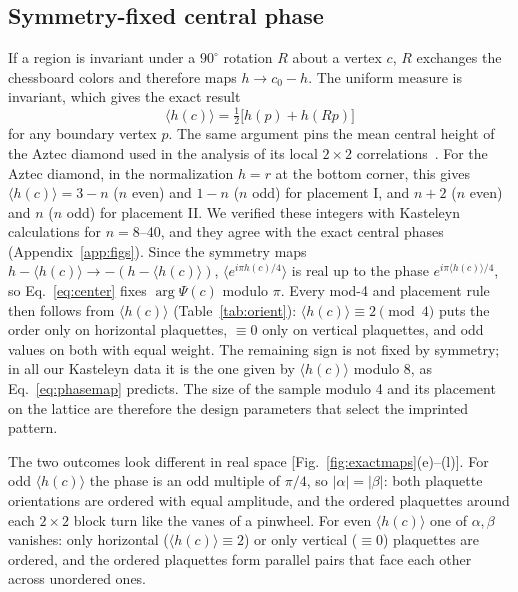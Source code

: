 \documentclass[aps,prb,twocolumn,floatfix,longbibliography]{revtex4-2}
\begin{document}
\subsection{Symmetry-fixed central phase}
\label{sec:center}

If a region is invariant under a $90^\circ$ rotation $R$ about a vertex $c$, $R$ exchanges the chessboard colors and therefore maps $h\to c_0-h$. The uniform measure is invariant, which gives the exact result
\begin{equation}
\langle h(c)\rangle=\tfrac12\bigl[h(p)+h(Rp)\bigr]
\label{eq:center}
\end{equation}
for any boundary vertex $p$. The same argument pins the mean central height of the Aztec diamond used in the analysis of its local $2\times2$ correlations~\cite{Kim2026}. For the Aztec diamond, in the normalization $h=r$ at the bottom corner, this gives $\langle h(c)\rangle=3-n$ ($n$ even) and $1-n$ ($n$ odd) for placement I, and $n+2$ ($n$ even) and $n$ ($n$ odd) for placement II. We verified these integers with Kasteleyn calculations for $n=8$--40, and they agree with the exact central phases (Appendix~\ref{app:figs}). Since the symmetry maps $h-\langle h(c)\rangle\to-(h-\langle h(c)\rangle)$, $\langle e^{i\pi h(c)/4}\rangle$ is real up to the phase $e^{i\pi\langle h(c)\rangle/4}$, so Eq.~\eqref{eq:center} fixes $\arg\Psi(c)$ modulo $\pi$. Every mod-4 and placement rule then follows from $\langle h(c)\rangle$ (Table~\ref{tab:orient}): $\langle h(c)\rangle\equiv2\pmod4$ puts the order only on horizontal plaquettes, $\equiv0$ only on vertical plaquettes, and odd values on both with equal weight. The remaining sign is not fixed by symmetry; in all our Kasteleyn data it is the one given by $\langle h(c)\rangle$ modulo 8, as Eq.~\eqref{eq:phasemap} predicts. The size of the sample modulo 4 and its placement on the lattice are therefore the design parameters that select the imprinted pattern.

The two outcomes look different in real space [Fig.~\ref{fig:exactmaps}(e)--(l)]. For odd $\langle h(c)\rangle$ the phase is an odd multiple of $\pi/4$, so $|\alpha|=|\beta|$: both plaquette orientations are ordered with equal amplitude, and the ordered plaquettes around each $2\times2$ block turn like the vanes of a pinwheel. For even $\langle h(c)\rangle$ one of $\alpha,\beta$ vanishes: only horizontal ($\langle h(c)\rangle\equiv2$) or only vertical ($\equiv0$) plaquettes are ordered, and the ordered plaquettes form parallel pairs that face each other across unordered ones.
\end{document}
